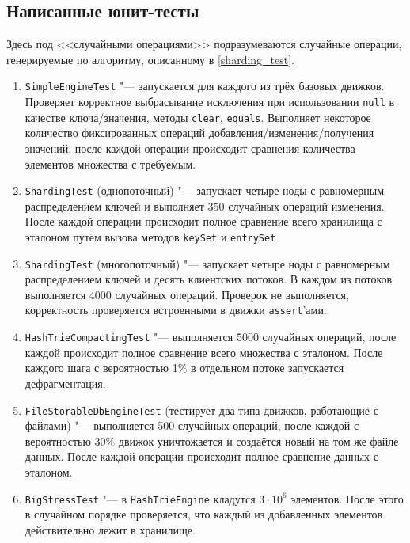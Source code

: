 \documentclass[a4paper]{article}
\renewcommand{\t}{\texttt}
\begin{document}
\subsection{Написанные юнит-тесты}
  Здесь под <<случайными операциями>> подразумеваются случайные операции, генерируемые
  по алгоритму, описанному в \ref{sharding_test}.

  \begin{enumerate}
  \item \t{SimpleEngineTest} "--- запускается для каждого из трёх базовых движков. Проверяет
        корректное выбрасывание исключения при использовании \t{null} в качестве ключа/значения,
        методы \t{clear}, \t{equals}. Выполняет некоторое количество фиксированных операций
        добавления/изменения/получения значений, после каждой операции происходит сравнения
        количества элементов множества с требуемым.
  \item \t{ShardingTest} (однопоточный) "--- запускает четыре ноды с равномерным распределением ключей и выполняет 350 случайных операций
        изменения. После каждой операции происходит полное сравнение всего хранилища с эталоном путём
        вызова методов \t{keySet} и \t{entrySet}
  \item \t{ShardingTest} (многопоточный) "--- запускает четыре ноды с равномерным распределением ключей и десять клиентских потоков. В каждом
        из потоков выполняется $4000$ случайных операций. Проверок не выполняется, корректность проверяется
        встроенными в движки \t{assert}'ами.
  \item \t{HashTrieCompactingTest} "--- выполняется $5000$ случайных операций, после каждой происходит полное
        сравнение всего множества с эталоном. После каждого шага с вероятностью 1\% в отдельном потоке запускается
        дефрагментация.
  \item \t{FileStorableDbEngineTest} (тестирует два типа движков, работающие с файлами) "--- 
        выполняется 500 случайных операций, после каждой с вероятностью 30\% движок уничтожается и создаётся
        новый на том же файле данных. После каждой операции происходит полное сравнение данных с эталоном.
  \item \t{BigStressTest} "--- в \t{HashTrieEngine} кладутся $3\cdot 10^6$ элементов. После этого в случайном
        порядке проверяется, что каждый из добавленных элементов действительно лежит в хранилище.
  \end{enumerate}
\end{document}
